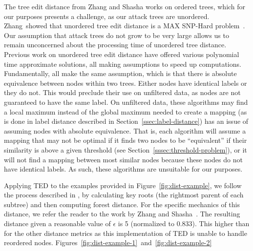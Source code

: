 The tree edit distance from Zhang and Shasha works on ordered trees, which for our purposes presents a challenge, as our attack trees are unordered. Zhang~\etal showed that unordered tree edit distance is a MAX SNP-Hard problem~\cite{zhang_max_1994}. Our assumption that attack trees do not grow to be very large allows us to remain unconcerned about the processing time of unordered tree distance. Previous work on unordered tree edit distance have offered various polynomial time approximate solutions, all making assumptions to speed up computations. Fundamentally, all make the same assumption, which is that there is absolute equivalence between nodes within two trees. Either nodes have identical labels or they do not. This would preclude their use on unfiltered data, as nodes are not guaranteed to have the same label. On unfiltered data, these algorithms may find a local maximum instead of the global maximum needed to create a mapping (as is done in label distance described in Section~\ref{ssec:label-distance}) has an issue of assuming nodes with absolute equivalence. That is, each algorithm will assume a mapping that may not be optimal if it finds two nodes to be ``equivalent'' if their similarity is above a given threshold (see Section~\ref{sssec:threshold-problem}), or it will not find a mapping between most similar nodes because these nodes do not have identical labels. As such, these algorithms are unsuitable for our purposes.


Applying TED to the examples provided in Figure~\ref{fig:dist-example}, we follow the process described in \cite{Zhang_Shasha_1989}, by calculating key roots (the rightmost parent of each subtree) and then computing forest distance. For the specific mechanics of this distance, we refer the reader to the work by Zhang and Shasha~\cite{Zhang_Shasha_1989}. The resulting distance given a reasonable value of $\epsilon$ is 5 (normalized to 0.833). This higher than for the other distance metrics as this implementation of TED is unable to handle reordered nodes.
Figures~\ref{fig:dist-example-1}~and~\ref{fig:dist-example-2}






